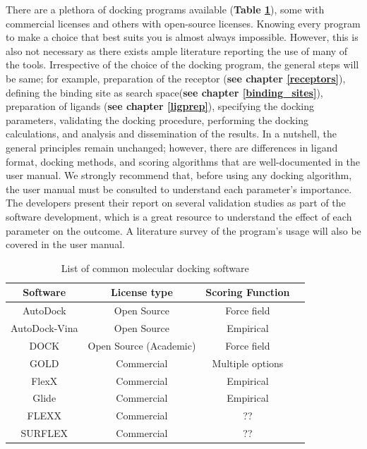 \documentclass[11pt]{article}
\begin{document}
There are a plethora of docking programs available (\textbf{Table \ref{tab:List}}), some with commercial licenses and others with open-source licenses. Knowing every program to make a choice that best suits you is almost always impossible. However, this is also not necessary as there exists ample literature reporting the use of many of the tools. Irrespective of the choice of the docking program, the general steps will be same; for example, preparation of the receptor (\textbf{see chapter \ref{receptors}}), defining the binding site as search space(\textbf{see chapter \ref{binding_sites}}), preparation of ligands (\textbf{see chapter \ref{ligprep}}), specifying the docking parameters, validating the docking procedure, performing the docking calculations, and analysis and dissemination of the results.  In a nutshell, the general principles remain unchanged; however, there are differences in ligand format, docking methods, and scoring algorithms that are well-documented in the user manual. We strongly recommend that, before using any docking algorithm, the user manual must be consulted to understand each parameter's importance. The developers present their report on several validation studies as part of the software development, which is a great resource to understand the effect of each parameter on the outcome. A literature survey of the program's usage will also be covered in the user manual. 


\begin{table}[ht]
    \centering
    \caption{List of common molecular docking software}
    \label{tab:List}
    \begin{tabular}{|c|c|c|c|}
    \hline
         \textbf{Software} & \textbf{License type} & \textbf{Scoring Function}  \\
    \hline
        AutoDock & Open Source & Force field  \\
        AutoDock-Vina & Open Source & Empirical  \\
        DOCK & Open Source (Academic) & Force field  \\
        GOLD &  Commercial & Multiple options \\
        FlexX &  Commercial & Empirical \\
        Glide &  Commercial & Empirical \\
        FLEXX & Commercial & ?? \\
        SURFLEX & Commercial & ?? \\
    \hline
    \end{tabular}
\end{table}
\end{document}
